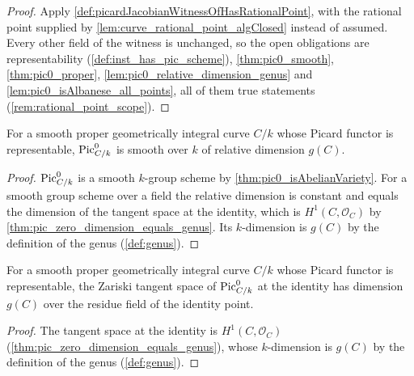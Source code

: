 \begin{proof}
  Apply \cref{def:picardJacobianWitnessOfHasRationalPoint}, with the rational point
  supplied by \cref{lem:curve_rational_point_algClosed} instead of assumed. Every
  other field of the witness is unchanged, so the open obligations are
  representability (\cref{def:inst_has_pic_scheme}), \cref{thm:pic0_smooth},
  \cref{thm:pic0_proper}, \cref{lem:pic0_relative_dimension_genus} and
  \cref{lem:pic0_isAlbanese_all_points}, all of them true statements
  (\cref{rem:rational_point_scope}).
\end{proof}

\begin{lemma}
  \label{lem:pic0_relative_dimension_genus}
  For a smooth proper geometrically integral curve \(C/k\) whose Picard functor is
  representable, \(\operatorname{Pic}^0_{C/k}\) is smooth over \(k\) of relative dimension
  \(g(C)\).
\end{lemma}

\begin{proof}
  \(\operatorname{Pic}^0_{C/k}\) is a smooth \(k\)-group scheme by
  \cref{thm:pic0_isAbelianVariety}. For a smooth group scheme over a field the
  relative dimension is constant and equals the dimension of the tangent space at
  the identity, which is \(H^1(C,\mathcal O_C)\) by
  \cref{thm:pic_zero_dimension_equals_genus}. Its \(k\)-dimension is \(g(C)\) by
  the definition of the genus (\cref{def:genus}).
\end{proof}

\begin{lemma}
  \label{lem:pic0_tangent_dimension_genus}
  \leanok
  For a smooth proper geometrically integral curve \(C/k\) whose Picard functor is
  representable, the Zariski tangent space of \(\operatorname{Pic}^0_{C/k}\) at the identity has
  dimension \(g(C)\) over the residue field of the identity point.
\end{lemma}

\begin{proof}
  The tangent space at the identity is \(H^1(C,\mathcal O_C)\)
  (\cref{thm:pic_zero_dimension_equals_genus}), whose \(k\)-dimension is \(g(C)\) by
  the definition of the genus (\cref{def:genus}).
\end{proof}

